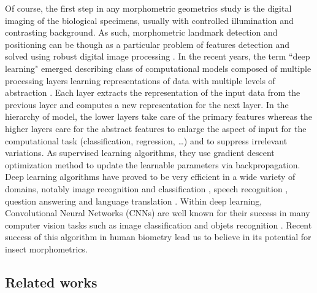\documentclass[review]{elsarticle}
\begin{document}
Of course, the first step in any morphometric geometrics study is the digital imaging of the biological specimens, usually with controlled illumination and contrasting background. As such, morphometric landmark detection and positioning can be though as a particular problem of features detection and solved using robust digital image processing \cite{gonzalez_digital_2006}. In the recent years, the term ``deep learning" emerged describing class of computational models composed of multiple processing layers learning representations of data with multiple levels of abstraction \cite{lecun2015deep}. Each layer extracts the representation of the input data from the previous layer and computes a new representation for the next layer. In the hierarchy of model, the lower layers take care of the primary features whereas the higher layers care for the abstract features to enlarge the aspect of input for the computational task (classification, regression, \ldots) and to suppress irrelevant variations. As supervised learning algorithms, they use gradient descent optimization method to update the learnable parameters via backpropagation. Deep learning algorithms have proved to be very efficient in a wide variety of domains, notably image recognition and classification \cite{krizhevsky2012imagenet, ciregan2012multi, szegedy2015going}, speech recognition \cite{mikolov2011strategies, hinton2012deep, sainath2013deep}, question answering \cite{bordes2014question} and language translation \cite{sutskever2014sequence, jean2014using}.
Within deep learning, Convolutional Neural Networks (CNNs) are well known for their success in many computer vision tasks such as image classification \cite{krizhevsky2012imagenet,ciregan2012multi} and  objets recognition \cite{li2015convolutional,tompson2014joint}.
Recent success of this algorithm in human biometry \cite{cintas2016automatic} lead us to believe in its potential for insect morphometrics.  

\subsection{Related works}\label{rw}
\end{document}

